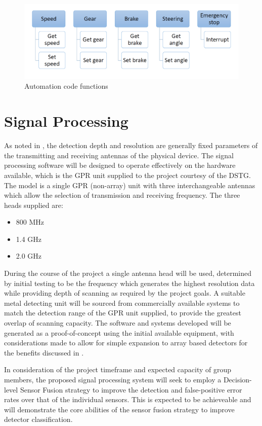 \documentclass[main.tex]{subfiles}
\begin{document}
\begin{figure}[ht]
\includegraphics[width=\textwidth]{4-ConceptDesign/autofunct.PNG}
\centering
\caption{Automation code functions} 
\end{figure}

\section{Signal Processing}
As noted in , the detection depth and resolution are generally fixed parameters of the transmitting and receiving antennas of the physical device. The signal processing software will be designed to operate effectively on the hardware available, which is the GPR unit supplied to the project courtesy of the DSTG. The model is a single GPR (non-array) unit with three interchangeable antennas which allow the selection of transmission and receiving frequency. The three heads supplied are:
\begin{itemize}
\item 800 MHz
\item 1.4 GHz
\item 2.0 GHz
\end{itemize}
During the course of the project a single antenna head will be used, determined by initial testing to be the frequency which generates the highest resolution data while providing depth of scanning as required by the project goals. A suitable metal detecting unit will be sourced from commercially available systems to match the detection range of the GPR unit supplied, to provide the greatest overlap of scanning capacity.
The software and systems developed will be generated as a proof-of-concept using the initial available equipment, with considerations made to allow for simple expansion to array based detectors for the benefits discussed in . 

In consideration of the project timeframe and expected capacity of group members, the proposed signal processing system will seek to employ a Decision-level Sensor Fusion strategy to improve the detection and false-positive error rates over that of the individual sensors. This is expected to be achieveable and will demonstrate the core abilities of the sensor fusion strategy to improve detector classification. \\
\end{document}
